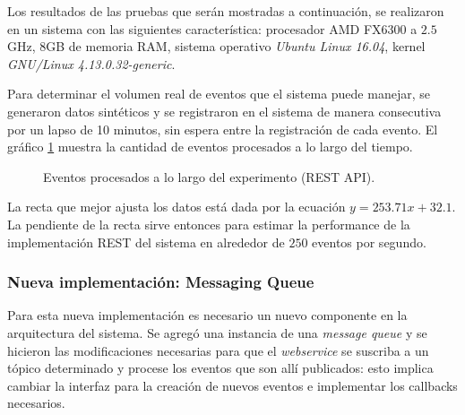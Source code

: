 \documentclass[a4paper,10pt, oneside]{article}
\begin{document}
Los resultados de las pruebas que serán mostradas a continuación, se realizaron en un sistema con las siguientes característica: procesador AMD FX6300 a $2.5$ GHz, 8GB de memoria RAM, sistema operativo \textit{Ubuntu Linux 16.04}, kernel \textit{GNU/Linux 4.13.0.32-generic}.

Para determinar el volumen real de eventos que el sistema puede manejar, se generaron datos sintéticos y se registraron en el sistema de manera consecutiva por un lapso de 10 minutos, sin espera entre la registración de cada evento. El gráfico \ref{fig:REST} muestra la cantidad de eventos procesados a lo largo del tiempo.

\begin{figure}[h]
	\centering
	
	\caption{Eventos procesados a lo largo del experimento (REST API).} \label{fig:REST}
\end{figure}

La recta que mejor ajusta los datos está dada por la ecuación $y = 253.71 x + 32.1$. La pendiente de la recta sirve entonces para estimar la performance de la implementación REST del sistema en alrededor de $250$ eventos por segundo.

\subsubsection{Nueva implementación: Messaging Queue}
Para esta nueva implementación es necesario un nuevo componente en la arquitectura del sistema. Se agregó una instancia de una \textit{message queue} y se hicieron las modificaciones necesarias para que el \textit{webservice} se suscriba a un tópico determinado y procese los eventos que son allí publicados: esto implica cambiar la interfaz para la creación de nuevos eventos e implementar los callbacks necesarios.
\end{document}
